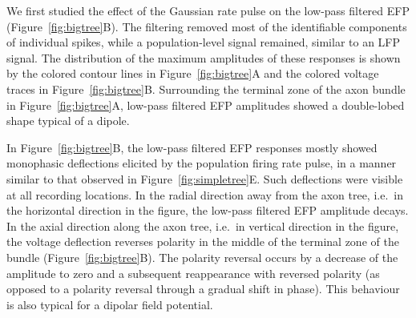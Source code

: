 \documentclass[]{elife}
\begin{document}
We first studied the effect of the Gaussian rate pulse on the low-pass
filtered EFP (Figure~\ref{fig:bigtree}B). The filtering removed most of
the identifiable components of individual spikes, while a
population-level signal remained, similar to an LFP signal. The
distribution of the maximum amplitudes of these responses is shown by
the colored contour lines in Figure~\ref{fig:bigtree}A and the colored
voltage traces in Figure~\ref{fig:bigtree}B. Surrounding the terminal
zone of the axon bundle in Figure~\ref{fig:bigtree}A, low-pass filtered
EFP amplitudes showed a double-lobed shape typical of a dipole.

In Figure~\ref{fig:bigtree}B, the low-pass filtered EFP responses mostly
showed monophasic deflections elicited by the population firing rate
pulse, in a manner similar to that observed in
Figure~\ref{fig:simpletree}E. Such deflections were visible at all
recording locations. In the radial direction away from the axon tree,
i.e.~in the horizontal direction in the figure, the low-pass filtered
EFP amplitude decays. In the axial direction along the axon tree,
i.e.~in vertical direction in the figure, the voltage deflection
reverses polarity in the middle of the terminal zone of the bundle
(Figure~\ref{fig:bigtree}B). The polarity reversal occurs by a decrease
of the amplitude to zero and a subsequent reappearance with reversed
polarity (as opposed to a polarity reversal through a gradual shift in
phase). This behaviour is also typical for a dipolar field potential.
\end{document}
